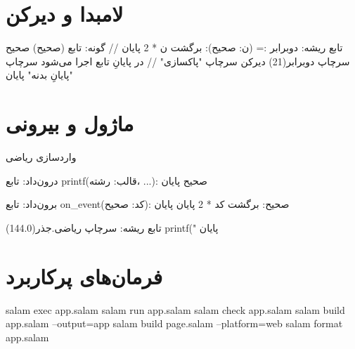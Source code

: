 \section{لامبدا و دیرکن}

\begin{salamfa}
تابع ریشه:
    دوبرابر := (ن: صحیح): برگشت ن * 2 پایان     // گونه: تابع (صحیح) صحیح
    سرچاپ دوبرابر(21)
    دیرکن سرچاپ "پاکسازی"                      // در پایانِ تابع اجرا می‌شود
    سرچاپ "پایانِ بدنه"
پایان
\end{salamfa}

\section{ماژول و بیرونی}

\begin{salamfa}
واردسازی ریاضی

درون‌داد:
    تابع printf(قالب: رشته، ...): صحیح
پایان

برون‌داد:
    تابع on_event(کد: صحیح): صحیح:
        برگشت کد * 2
    پایان
پایان

تابع ریشه:
    سرچاپ ریاضی.جذر(144.0)
    printf("%
پایان
\end{salamfa}

\section{فرمان‌های پرکاربرد}

\begin{salamen}[language={}]
salam exec app.salam
salam run app.salam
salam check app.salam
salam build app.salam --output=app
salam build page.salam --platform=web
salam format app.salam
\end{salamen}
